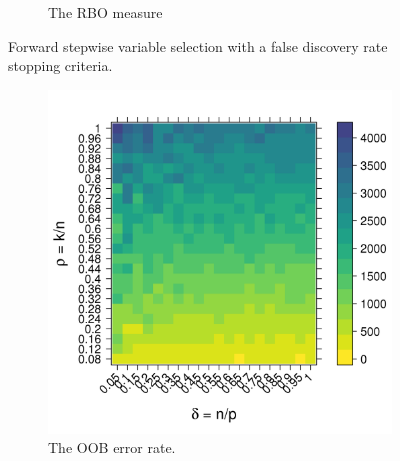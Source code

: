 \documentclass[10pt,letterpaper]{article}
\begin{document}
\begin{figure}[tbhp]
\begin{subfigure}[t]{0.5\linewidth}
       \caption{The RBO measure}
       \label{figure:rbo_Stodden_FDR.png}
     \end{subfigure} 
     \caption{Forward stepwise variable selection with a false discovery rate stopping criteria.}
       \label{figure:error_Stodden_FDR.png}
 \end{figure}

 \begin{figure}[tbhp] 
     \begin{subfigure}[t]{0.5\linewidth}
       \centering
       \includegraphics[totalheight=6cm]{./figs/ranger_error_Stodden_simulation.png}
       \caption{The OOB error rate.}
       \label{figure:ranger_error_Stodden_simulation.png}
       \vspace{4ex}
     \end{subfigure} 
     \begin{subfigure}[t]{0.5\linewidth}
       \centering

\end{subfigure}
\end{figure}
\end{document}
